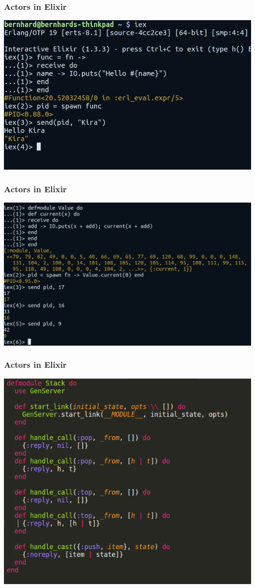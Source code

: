 \documentclass{beamer}
\begin{document}

\begin{frame}
\frametitle{Actors in Elixir}
\includegraphics[width=1\linewidth]{./images/elixir_hello_kira.jpg}
\end{frame}


\begin{frame}
\frametitle{Actors in Elixir}
\includegraphics[width=1\linewidth]{./images/elixir_state.png}
\end{frame}


\begin{frame}
\frametitle{Actors in Elixir}
\includegraphics[width=0.6\linewidth]{./images/elixir_stack.png}
\end{frame}
\end{document}
